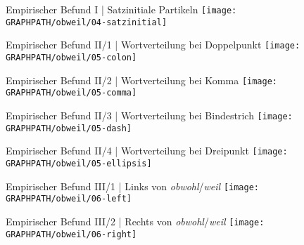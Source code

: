 \begin{frame}
  {Empirischer Befund I | Satzinitiale Partikeln}
  \centering 
  \texttt{[image: \\GRAPHPATH/obweil/04-satzinitial]}
\end{frame}

\begin{frame}
  {Empirischer Befund II/1 | Wortverteilung bei Doppelpunkt}
  \centering 
  \texttt{[image: \\GRAPHPATH/obweil/05-colon]}
\end{frame}

\begin{frame}
  {Empirischer Befund II/2 | Wortverteilung bei Komma}
  \centering 
  \texttt{[image: \\GRAPHPATH/obweil/05-comma]}
\end{frame}

\begin{frame}
  {Empirischer Befund II/3 | Wortverteilung bei Bindestrich}
  \centering 
  \texttt{[image: \\GRAPHPATH/obweil/05-dash]}
\end{frame}

\begin{frame}
  {Empirischer Befund II/4 | Wortverteilung bei Dreipunkt}
  \centering 
  \texttt{[image: \\GRAPHPATH/obweil/05-ellipsis]}
\end{frame}

\begin{frame}
  {Empirischer Befund III/1 | Links von \textit{obwohl}\slash \textit{weil}}
  \centering 
  \texttt{[image: \\GRAPHPATH/obweil/06-left]}
\end{frame}

\begin{frame}
  {Empirischer Befund III/2 | Rechts von \textit{obwohl}\slash \textit{weil}}
  \centering 
  \texttt{[image: \\GRAPHPATH/obweil/06-right]}
\end{frame}



